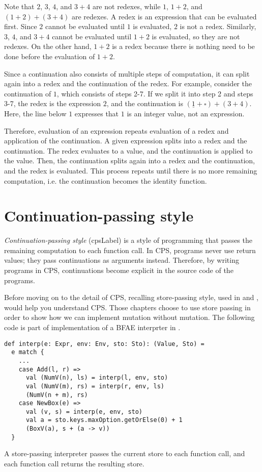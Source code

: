 Note that $2$, $3$, $4$, and $3+4$ are not redexes, while $1$, $1+2$,
and $(1+2)+(3+4)$ are redexes. A redex is an expression that can be evaluated first.
Since $2$ cannot be evaluated until $1$ is evaluated, $2$ is not a redex.
Similarly, $3$, $4$, and $3+4$ cannot be evaluated until $1+2$ is evaluated, so
they are not redexes. On the other hand, $1+2$ is a redex because there is
nothing need to be done before the evaluation of $1+2$.

Since a continuation also consists of multiple steps of computation, it can
split again into a redex and the continuation of the redex. For example,
consider the continuation of $1$, which consists of steps 2-7.
If we split it into step 2 and steps 3-7, the redex is the expression
$2$, and the continuation is $(\underline{1}+\square)+(3+4)$. Here, the
line below $1$ expresses that $1$ is an integer value, not an expression.

Therefore, evaluation of an expression repeats evaluation of a redex and
application of the continuation. A given expression splits into a redex and the
continuation. The redex evaluates to a value, and the continuation is applied
to the value. Then, the continuation splits again into a redex and the
continuation, and the redex is evaluated. This process repeats until there is no
more remaining computation, i.e. the continuation becomes the identity function.

\section{Continuation-passing style}

\textit{Continuation-passing style}
(\acrshort{cpsLabel}) is a style of programming that
passes the remaining computation to each function call. In CPS, programs never
use return values; they pass continuations as arguments instead. Therefore, by
writing programs in CPS, continuations become explicit in the source code of the
programs.

Before moving on to the detail of CPS, recalling
store-passing style, used in  and , would help you
understand CPS. Those chapters
choose to use store passing in order to show how we can implement mutation
without mutation. The following code is part of implementation of a
\textsf{BFAE} interprter in .
\begin{verbatim}
def interp(e: Expr, env: Env, sto: Sto): (Value, Sto) =
  e match {
    ...
    case Add(l, r) =>
      val (NumV(n), ls) = interp(l, env, sto)
      val (NumV(m), rs) = interp(r, env, ls)
      (NumV(n + m), rs)
    case NewBox(e) =>
      val (v, s) = interp(e, env, sto)
      val a = sto.keys.maxOption.getOrElse(0) + 1
      (BoxV(a), s + (a -> v))
  }
\end{verbatim}
A store-passing interpreter passes the current store to each function call, and
each function call returns the resulting store.

